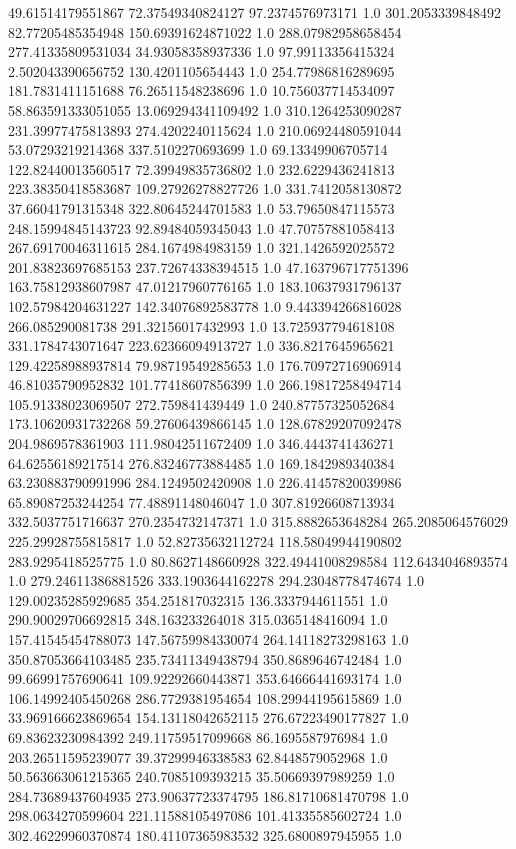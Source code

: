 49.61514179551867	72.37549340824127	97.2374576973171	1.0
301.2053339848492	82.77205485354948	150.69391624871022	1.0
288.07982958658454	277.41335809531034	34.93058358937336	1.0
97.99113356415324	2.502043390656752	130.4201105654443	1.0
254.77986816289695	181.7831411151688	76.26511548238696	1.0
10.756037714534097	58.863591333051055	13.069294341109492	1.0
310.1264253090287	231.39977475813893	274.4202240115624	1.0
210.06924480591044	53.07293219214368	337.5102270693699	1.0
69.13349906705714	122.82440013560517	72.39949835736802	1.0
232.6229436241813	223.38350418583687	109.27926278827726	1.0
331.7412058130872	37.66041791315348	322.80645244701583	1.0
53.79650847115573	248.15994845143723	92.89484059345043	1.0
47.70757881058413	267.69170046311615	284.1674984983159	1.0
321.1426592025572	201.83823697685153	237.72674338394515	1.0
47.163796717751396	163.75812938607987	47.01217960776165	1.0
183.10637931796137	102.57984204631227	142.34076892583778	1.0
9.443394266816028	266.085290081738	291.32156017432993	1.0
13.725937794618108	331.1784743071647	223.62366094913727	1.0
336.8217645965621	129.42258988937814	79.98719549285653	1.0
176.70972716906914	46.81035790952832	101.77418607856399	1.0
266.19817258494714	105.91338023069507	272.759841439449	1.0
240.87757325052684	173.10620931732268	59.27606439866145	1.0
128.67829207092478	204.9869578361903	111.98042511672409	1.0
346.4443741436271	64.62556189217514	276.83246773884485	1.0
169.1842989340384	63.230883790991996	284.1249502420908	1.0
226.41457820039986	65.89087253244254	77.48891148046047	1.0
307.81926608713934	332.5037751716637	270.2354732147371	1.0
315.8882653648284	265.2085064576029	225.29928755815817	1.0
52.82735632112724	118.58049944190802	283.9295418525775	1.0
80.8627148660928	322.49441008298584	112.6434046893574	1.0
279.24611386881526	333.1903644162278	294.23048778474674	1.0
129.00235285929685	354.251817032315	136.3337944611551	1.0
290.90029706692815	348.163233264018	315.0365148416094	1.0
157.41545454788073	147.56759984330074	264.14118273298163	1.0
350.87053664103485	235.73411349438794	350.8689646742484	1.0
99.66991757690641	109.92292660443871	353.64666441693174	1.0
106.14992405450268	286.7729381954654	108.29944195615869	1.0
33.969166623869654	154.13118042652115	276.67223490177827	1.0
69.83623230984392	249.11759517099668	86.1695587976984	1.0
203.26511595239077	39.37299946338583	62.8448579052968	1.0
50.563663061215365	240.7085109393215	35.50669397989259	1.0
284.73689437604935	273.90637723374795	186.81710681470798	1.0
298.0634270599604	221.11588105497086	101.41335585602724	1.0
302.46229960370874	180.41107365983532	325.6800897945955	1.0
